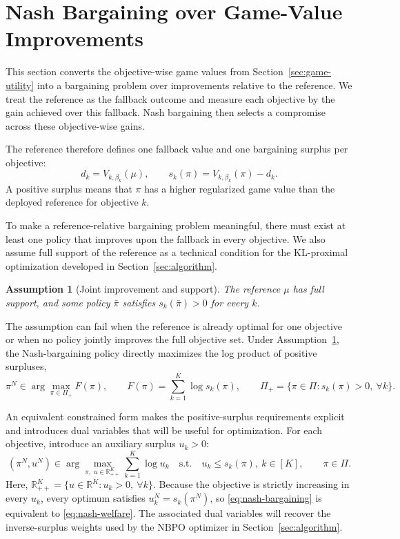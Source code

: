 \documentclass{article}
\newtheorem{assumption}{Assumption}
\theoremstyle{remark}
\theoremstyle{plain}
\begin{document}
\section{Nash Bargaining over Game-Value Improvements}
\label{sec:bargaining}
This section converts the objective-wise game values from Section~\ref{sec:game-utility} into a bargaining problem over improvements relative to the reference. We treat the reference as the fallback outcome and measure each objective by the gain achieved over this fallback. Nash bargaining then selects a compromise across these objective-wise gains.

The reference therefore defines one fallback value and one bargaining
surplus per objective:
\begin{equation}
d_k=V_{k,\beta_k}(\mu),
\qquad
s_k(\pi)=V_{k,\beta_k}(\pi)-d_k.
\label{eq:game-surplus}
\end{equation}
A positive surplus means that $\pi$ has a higher regularized game value than the deployed reference for objective $k$.

To make a reference-relative bargaining problem meaningful, there must exist at least one policy that improves upon the fallback in every objective. We also assume full support of the reference as a technical condition for the KL-proximal optimization developed in Section~\ref{sec:algorithm}.

\begin{assumption}[Joint improvement and support]
\label{ass:joint}
The reference $\mu$ has full support, and some policy $\bar\pi$ satisfies $s_k(\bar\pi)>0$ for every $k$.
\end{assumption}
The assumption can fail when the reference is already optimal for one
objective or when no policy jointly improves the full objective set.
Under Assumption~\ref{ass:joint}, the Nash-bargaining policy directly
maximizes the log product of positive surpluses,
\begin{equation}
\pi^N
\in
\arg\max_{\pi\in\Pi_+}
F(\pi),
\qquad
F(\pi)=\sum_{k=1}^K\log s_k(\pi),
\qquad
\Pi_+=\{\pi\in\Pi:s_k(\pi)>0,\ \forall k\}.
\label{eq:nash-welfare}
\end{equation}

An equivalent constrained form makes the positive-surplus requirements
explicit and introduces dual variables that will be useful for optimization.
For each objective, introduce an auxiliary surplus $u_k>0$:
\begin{equation}
(\pi^N,u^N)
\in
\arg\max_{\pi,\;u\in\mathbb{R}_{++}^K}
\sum_{k=1}^K\log u_k
\quad
\text{s.t.}\quad
u_k\le s_k(\pi),\ k\in[K],\qquad
\pi\in\Pi.
\label{eq:nash-bargaining}
\end{equation}
Here,
$\mathbb{R}_{++}^K=\{u\in\mathbb{R}^K:u_k>0,\ \forall k\}$.
Because the objective is strictly increasing in every $u_k$, every
optimum satisfies $u_k^N=s_k(\pi^N)$, so
\eqref{eq:nash-bargaining} is equivalent to
\eqref{eq:nash-welfare}. The associated dual variables will recover the
inverse-surplus weights used by the NBPO optimizer in
Section~\ref{sec:algorithm}.
\end{document}
